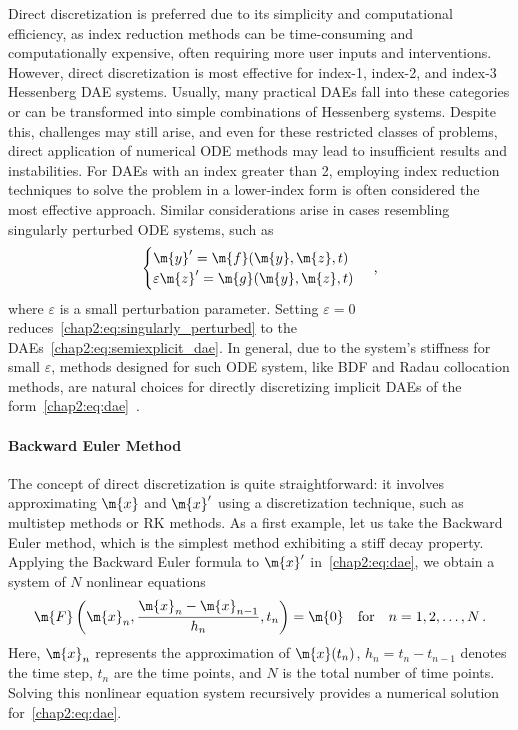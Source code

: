Direct discretization is preferred due to its simplicity and computational efficiency, as index reduction methods can be time-consuming and computationally expensive, often requiring more user inputs and interventions. However, direct discretization is most effective for index-1, index-2, and index-3 Hessenberg \ac{DAE} systems. Usually, many practical \acp{DAE} fall into these categories or can be transformed into simple combinations of Hessenberg systems. Despite this, challenges may still arise, and even for these restricted classes of problems, direct application of numerical \ac{ODE} methods may lead to insufficient results and instabilities. For \acp{DAE} with an index greater than 2, employing index reduction techniques to solve the problem in a lower-index form is often considered the most effective approach. Similar considerations arise in cases resembling singularly perturbed \ac{ODE} systems, such as
%
\begin{equation}
  \begin{cases}
  \m{y}^{\prime} = \m{f}(\m{y}, \m{z}, t) \\
  \varepsilon \m{z}^{\prime} = \m{g}(\m{y}, \m{z}, t)
  \end{cases} \, \text{,}
  \label{chap2:eq:singularly_perturbed}
\end{equation}
%
where $\varepsilon$ is a small perturbation parameter. Setting $\varepsilon = 0$ reduces~\eqref{chap2:eq:singularly_perturbed} to the \acp{DAE}~\eqref{chap2:eq:semiexplicit_dae}. In general, due to the system's stiffness for small $\varepsilon$, methods designed for such \ac{ODE} system, like \ac{BDF} and Radau collocation methods, are natural choices for directly discretizing implicit \acp{DAE} of the form~\eqref{chap2:eq:dae}~\cite{martinvaquero2010radau}.

\paragraph{Backward Euler Method}

The concept of direct discretization is quite straightforward: it involves approximating $\m{x}$ and $\m{x}^{\prime}$ using a discretization technique, such as multistep methods or \ac{RK} methods. As a first example, let us take the Backward Euler method, which is the simplest method exhibiting a stiff decay property. Applying the Backward Euler formula to $\m{x}^{\prime}$ in~\eqref{chap2:eq:dae}, we obtain a system of $N$ nonlinear equations
%
\begin{equation}
  \m{F}\left(\m{x}_n, \dfrac{\m{x}_n - \m{x}_{n-1}}{h_n}, t_n\right) = \m{0} \quad \text{for} \quad n = 1, 2, \dots, N \, \text{.}
  \label{chap2:eq:backward_euler}
\end{equation}
%
Here, $\m{x}_n$ represents the approximation of $\m{x}(t_n)$, $h_n = t_n - t_{n-1}$ denotes the time step, $t_n$ are the time points, and $N$ is the total number of time points. Solving this nonlinear equation system recursively provides a numerical solution for~\eqref{chap2:eq:dae}.

